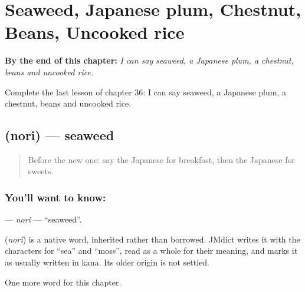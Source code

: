 
\chapter{Seaweed, Japanese plum, Chestnut, Beans, Uncooked rice}
\label{ch:ja-seaweed-japanese-plum-chestnut-beans-uncooked-rice}

\begin{chapteropening}
\textbf{By the end of this chapter:} \emph{I can say seaweed, a Japanese plum, a chestnut, beans and uncooked rice.}

Complete the last lesson of chapter 36: I can say seaweed, a Japanese plum, a chestnut, beans and uncooked rice.
\end{chapteropening}

\section[\texorpdfstring{\ja{のり} (nori)}{のり (nori)}]{ (nori) — seaweed}

\label{lesson:JA-C36-nori}



\begin{quote}
Before the new one: say the Japanese for breakfast, then the Japanese for sweets.
\end{quote}

\subsection*{You'll want to know: }
\textbf{} — \emph{nori} — \textquotedblleft{}seaweed\textquotedblright{}.

\begin{cousinweb}
\textbf{} (\emph{nori}) is a native word, inherited rather than borrowed. JMdict writes it with the characters for \textquotedblleft{}sea\textquotedblright{} and \textquotedblleft{}moss\textquotedblright{}, read as a whole for their meaning, and marks it as usually written in kana. Its older origin is not settled.
\end{cousinweb}

\begin{grammarlens}[title={What you've built}]
One more word for this chapter.
\end{grammarlens}

